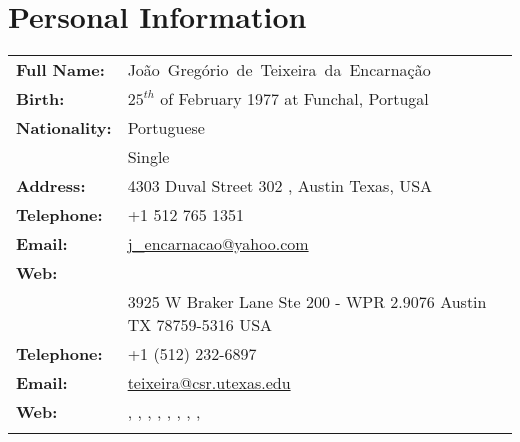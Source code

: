 \documentclass[a4paper]{article}
\newcommand{\dynhref}[2]{%
  \iftoggle{expliciturl}{%
    #2 (\href{#1}{\texttt{\detokenize{#1}}})%
  }{%
    \href{#1}{#2}%
  }%
}
\newcommand{\homecv}[2]{\iftoggle{homecontact}{#1}{#2}}
\newlength{\listskipsmall}
\newenvironment{cvsection}[2]{
  \setlength{\floatsep}{0pt}
  \setlength{\textfloatsep}{0pt}
  \setlength{\intextsep}{0pt}
  \section*{#1}
  \begin{longtable}{lp{#2}}
}{
  \end{longtable}
}
\begin{document}
\begin{cvsection}{Personal Information}{12.5cm}

{\bf Full Name:} & Jo\~ao~Greg\'orio~de~Teixeira~da~Encarna\c c\~ao \\[\listskipsmall]
{\bf Birth:} & $25^{th}$ of February 1977 at Funchal, Portugal \\[\listskipsmall]
{\bf Nationality:} &  Portuguese\\[\listskipsmall]

\homecv{%
  {\bf Marital Status:} & Single \\[\listskipsmall]
  {\bf Address:}   & 4303 Duval Street 302 \newline
                    78751, Austin Texas, USA\\[\listskipsmall]
  {\bf Telephone:} & +1 512 765 1351\\[\listskipsmall]
  {\bf Email:}     & \href{mailto:j_encarnacao@yahoo.com}{j\_encarnacao@yahoo.com}\\[\listskipsmall]
  {\bf Web:}       & \dynhref{http://nl.linkedin.com/in/joaoencarnacao}{LinkedIn}\\[\listskipsmall]
}{%
  {\bf Address:}   & 3925 W Braker Lane Ste 200 - WPR 2.9076\newline
                     Austin TX 78759-5316\newline
                    USA\\[\listskipsmall]
  {\bf Telephone:} & +1 (512) 232-6897\\[\listskipsmall]
  {\bf Email:}     & \href{mailto:teixeira@csr.utexas.edu}{teixeira@csr.utexas.edu}\\[\listskipsmall]
  {\bf Web:}       & \dynhref{https://directory.utexas.edu/index.php?q=joao+encarnacao}{University of Texas},
                     \dynhref{http://nl.linkedin.com/in/joaoencarnacao}{LinkedIn},
                     \dynhref{https://www.researchgate.net/profile/Joao_Encarnacao2}{ResearchGate},
                     \dynhref{https://scholar.google.com/citations?user=k2liFwQAAAAJ}{Google Scholar},
                     \dynhref{http://orcid.org/0000-0001-6824-2733}{ORCID},
                     \dynhref{https://www.mendeley.com/profiles/joao-encarnacao4/}{Mendeley},
                     \dynhref{https://www.scopus.com/authid/detail.uri?authorId=15135565900}{SCOPUS},
                     \dynhref{https://publons.com/a/782170/}{Publons},
                     \dynhref{https://github.com/jgte}{GitHub}\\[\listskipsmall]
}
\end{cvsection}
\end{document}
